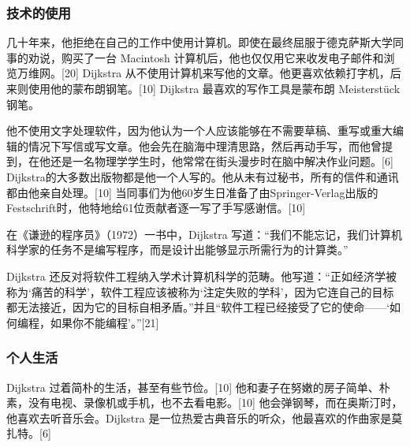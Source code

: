 \subsubsection{技术的使用}
几十年来，他拒绝在自己的工作中使用计算机。即使在最终屈服于德克萨斯大学同事的劝说，购买了一台 Macintosh 计算机后，他也仅仅用它来收发电子邮件和浏览万维网。[20] Dijkstra 从不使用计算机来写他的文章。他更喜欢依赖打字机，后来则使用他的蒙布朗钢笔。[10] Dijkstra 最喜欢的写作工具是蒙布朗 Meisterstück 钢笔。

他不使用文字处理软件，因为他认为一个人应该能够在不需要草稿、重写或重大编辑的情况下写信或写文章。他会先在脑海中理清思路，然后再动手写，而他曾提到，在他还是一名物理学学生时，他常常在街头漫步时在脑中解决作业问题。[6] Dijkstra的大多数出版物都是他一个人写的。他从未有过秘书，所有的信件和通讯都由他亲自处理。[10] 当同事们为他60岁生日准备了由Springer-Verlag出版的Festschrift时，他特地给61位贡献者逐一写了手写感谢信。[10]

在《谦逊的程序员》（1972）一书中，Dijkstra 写道：“我们不能忘记，我们计算机科学家的任务不是编写程序，而是设计出能够显示所需行为的计算类。”

Dijkstra 还反对将软件工程纳入学术计算机科学的范畴。他写道：“正如经济学被称为‘痛苦的科学’，软件工程应该被称为‘注定失败的学科’，因为它连自己的目标都无法接近，因为它的目标自相矛盾。”并且“软件工程已经接受了它的使命——‘如何编程，如果你不能编程’。”[21]
\subsubsection{个人生活}
Dijkstra 过着简朴的生活，甚至有些节俭。[10] 他和妻子在努嫩的房子简单、朴素，没有电视、录像机或手机，也不去看电影。[10] 他会弹钢琴，而在奥斯汀时，他喜欢去听音乐会。Dijkstra 是一位热爱古典音乐的听众，他最喜欢的作曲家是莫扎特。[6]